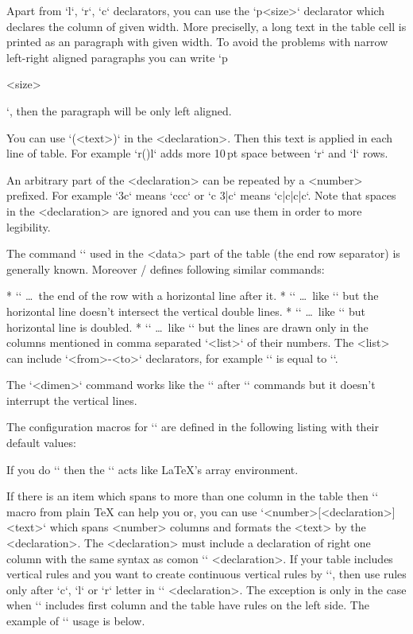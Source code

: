 {Apart from `l`, `r`, `c` declarators, you can use the `p{<size>}` declarator
which declares the column of given width. More preciselly, a long text in
the table cell is printed as an paragraph with given width.
To avoid the problems with narrow left-right aligned paragraphs you can write
`p{<size>\raggedright}`, then the paragraph will be only left aligned.

You can use `(<text>)` in the <declaration>. Then this text is applied in
each line of table. For example `r(\kern10pt)l` adds more 10\,pt space
between `r` and `l` rows. 

An arbitrary part of the <declaration> can be repeated by a <number>
prefixed. For example `3c` means `ccc` or `c 3{|c}` means
`c|c|c|c`. Note that spaces in the <declaration> are ignored and you 
can use them in order to more legibility.
 
The command `\cr` used in the <data> part of the table (the end row
separator) is generally known. 
Moreover \OpTeX/ defines following similar commands:

\begitems
* `\crl` \dots\ the end of the row with a horizontal line after it.
* `\crli` \dots\ like `\crl` but the horizontal line doesn't intersect the
      vertical double lines.
* `\crlli` \dots\ like `\crli` but horizontal line is doubled.
* `` \dots\ like `\crli` but the lines are drawn only in the
  columns mentioned in comma separated `<list>` of their numbers.
  The <list> can include `<from>-<to>` declarators, for example
  `` is equal to ``. 
\enditems

The `\tskip<dimen>` command works like the `` 
after `\cr*` commands but it doesn't interrupt the vertical lines.

The configuration macros for `\table` are defined in the following listing
with their default values:

\begtt
\def\tabiteml{\enspace} %
\def\tabitemr{\enspace} %
\def\tabstrut{\strut}   %
\def\vvkern{1pt}        %
\def\hhkern{1pt}        %
\endtt

If you do `\def\tabiteml{$\enspace}\def\tabitemr{\enspace$}` then
the `\table` acts like \LaTeX's array environment.

If there is an item which spans to more than one column in the table then
`` macro from plain \TeX{} can help you or, you can use
`\mspan<number>[<declaration>]{<text>}`
which spans <number> columns and formats the <text> by the
<declaration>. The <declaration> must include a declaration of right one column
with the same syntax as comon `\table` <declaration>.
If your table includes vertical rules and you want to
create continuous vertical rules by `\mspan`, then use rules
only after `c`, `l` or `r` letter in `\mspan` <declaration>. The
exception is only in the case when `\mspan` includes first
column and the table have rules on the left side. The example of `\mspan` usage is below.

}
